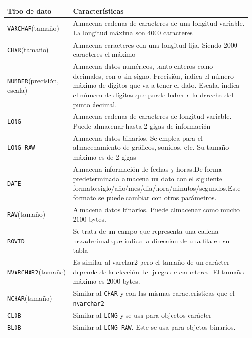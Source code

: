 \begin{center}
  \scriptsize	
  \label{tablaTipoDatos1} %
  \renewcommand{\arrayrulewidth}{1pt}
\begin{tabular}{|p{40mm}|p{98mm}|}\hline
\textbf{Tipo de dato} & \textbf{Caracter\'isticas}\\\hline
\texttt{VARCHAR}(tama\~no) & Almacena cadenas de caracteres de una longitud variable.
La longitud m\'axima son 4000 caracteres \\\hline
\texttt{CHAR}(tama\~no)&
Almacena caracteres con una longitud fija. Siendo 2000 caracteres el máximo\\\hline
\texttt{NUMBER}(precisi\'on, escala) &
Almacena datos num\'ericos, tanto enteros como decimales, con o sin signo. Precisi\'on, indica el n\'umero m\'aximo de d\'igitos que va a tener el dato. Escala, indica el n\'umero de d\'igitos que puede haber a la derecha del punto decimal.\\\hline
\texttt{LONG}&
Almacena cadenas de caracteres de longitud variable. Puede almacenar hasta 2 gigas de informaci\'on\\\hline
\texttt{LONG RAW}&
Almacena datos binarios. Se emplea para el almacenamiento de gr\'aficos, sonidos, etc. Su tamaño m\'aximo es de 2 gigas\\\hline
\texttt{DATE} &
Almacena informaci\'on de fechas y horas.De forma predeterminada almacena un dato con el siguiente formato:siglo/a\~no/mes/dia/hora/minutos/segundos.Este formato se puede cambiar con otros par\'ametros.\\\hline
\texttt{RAW}(tama\~no)&
Almacena datos binarios. Puede almacenar como mucho 2000 bytes.\\\hline
\texttt{ROWID}&
Se trata de un campo que representa una cadena hexadecimal que indica la direcci\'on de una fila en su tabla\\\hline
\texttt{NVARCHAR2}(tama\~no)&
Es similar al varchar2 pero el tama\~no de un car\'acter depende de la elecci\'on del juego de caracteres. El tama\~no m\'aximo es 2000 bytes.\\\hline
\texttt{NCHAR}(tama\~no)&
Similar al \texttt{CHAR} y con las mismas caracter\'isticas que el \texttt{nvarchar2}\\\hline
\texttt{CLOB}&
Similar al \texttt{LONG} y se usa para objectos car\'acter\\\hline
\texttt{BLOB} &
Similar al \texttt{LONG RAW}. Este se usa para objetos binarios.\\\hline
\end{tabular}
\end{center}

